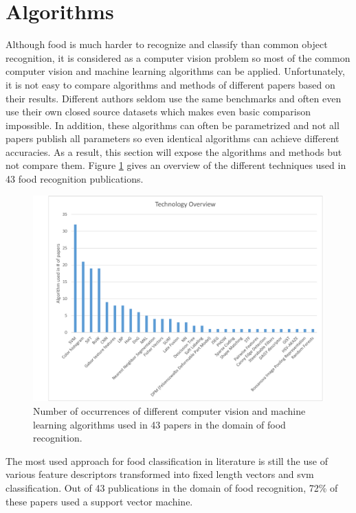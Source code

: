 \section{Algorithms}
\label{sec:relWork_Algorithms}
Although food is much harder to recognize and classify than common object recognition, it is considered as a computer vision problem so most of the common computer vision and machine learning algorithms can be applied. Unfortunately, it is not easy to compare algorithms and methods of different papers based on their results. Different authors seldom use the same benchmarks and often even use their own closed source datasets which makes even basic comparison impossible. In addition, these algorithms can often be parametrized and not all papers publish all parameters so even identical algorithms can achieve different accuracies. As a result, this section will expose the algorithms and methods but not compare them. Figure \ref{fig:overviewAlgorithms} gives an overview of the different techniques used in 43 food recognition publications.

\begin{figure}[ht]
	\includegraphics[width=\linewidth]{figures/technologyOverview}
	\caption{Number of occurrences of different computer vision and machine learning algorithms used in 43 papers in the domain of food recognition.}
	\label{fig:overviewAlgorithms}
\end{figure}


The most used approach for food classification in literature is still the use of various feature descriptors transformed into fixed length vectors and \gls{svm} classification. Out of 43 publications in the domain of food recognition, 72\% of these papers used a support vector machine. 


